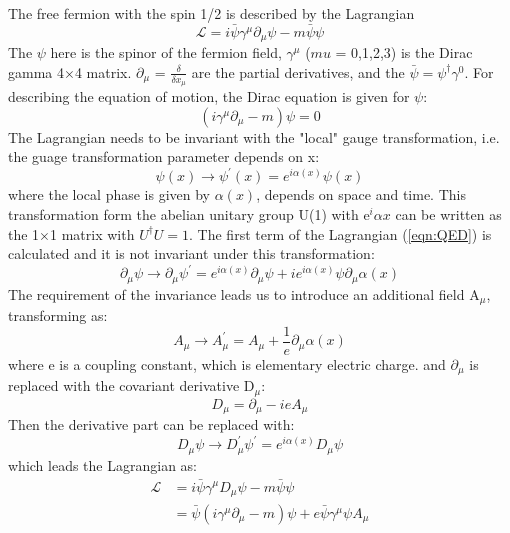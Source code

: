 The free fermion with the spin 1/2 is described by the Lagrangian\\
\begin{equation}
\label{eqn:QED}
\mathcal{L}=i \bar{\psi} \gamma^{\mu} \partial_{\mu} \psi-m \bar{\psi} \psi
\end{equation}
The $\psi$ here is the spinor of the fermion field, $\gamma^{\mu}$  ($mu$ = 0,1,2,3) is the Dirac gamma 4$\times$4 matrix. $\partial_{\mu}$ = $\frac{\delta}{\delta x_{\mu}}$ are the partial derivatives, and the $\bar{\psi}=\psi^{\dagger} \gamma^{0}$.
For describing the equation of motion, the Dirac equation is given for $\psi$:
\begin{equation}
\left(i \gamma^{\mu} \partial_{\mu}-m\right) \psi=0
\end{equation}
The Lagrangian needs to be invariant with the "local" gauge transformation, i.e. the guage transformation parameter depends on x:
\begin{equation}
\psi(x) \rightarrow \psi^{\prime}(x)=e^{i \alpha(x)} \psi(x)
\end{equation}
where the local phase is given by $\alpha(x)$, depends on space and time. 
This transformation form the abelian unitary group U(1) with e$^i\alpha{x}$ can be written as the 1$\times$1 matrix with $U^{\dagger} U=1$.
The first term of the Lagrangian (\ref{eqn:QED}) is calculated and it is not invariant under this transformation:
\begin{equation}
\partial_{\mu} \psi \rightarrow \partial_{\mu} \psi^{\prime}=e^{i \alpha(x)} \partial_{\mu} \psi+i e^{i \alpha(x)} \psi \partial_{\mu} \alpha(x)
\end{equation}
The requirement of the invariance leads us to introduce an additional field A$_\mu$, transforming as:
\begin{equation}
A_{\mu} \rightarrow A_{\mu}^{\prime}=A_{\mu}+\frac{1}{e} \partial_{\mu} \alpha(x)
\end{equation}
where e is a coupling constant, which is elementary electric charge. 
and $\partial_{\mu}$ is replaced with the covariant derivative D$_\mu$:
\begin{equation}
D_{\mu}=\partial_{\mu}-i e A_{\mu}
\end{equation}
Then the derivative part can be replaced with:
\begin{equation}
D_{\mu} \psi \rightarrow D_{\mu}^{\prime} \psi^{\prime}=e^{i \alpha(x)} D_{\mu} \psi
\end{equation}
which leads the Lagrangian as:
\begin{equation}
\begin{aligned}
\mathcal{L} &=i \bar{\psi} \gamma^{\mu} D_{\mu} \psi-m \bar{\psi} \psi \\
&=\bar{\psi}\left(i \gamma^{\mu} \partial_{\mu}-m\right) \psi+e \bar{\psi} \gamma^{\mu} \psi A_{\mu}
\end{aligned}
\end{equation}
